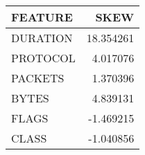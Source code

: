 \begin{tabular}{lr}
\toprule
 FEATURE &      SKEW \\
\midrule
DURATION & 18.354261 \\
PROTOCOL &  4.017076 \\
 PACKETS &  1.370396 \\
   BYTES &  4.839131 \\
   FLAGS & -1.469215 \\
   CLASS & -1.040856 \\
\bottomrule
\end{tabular}
